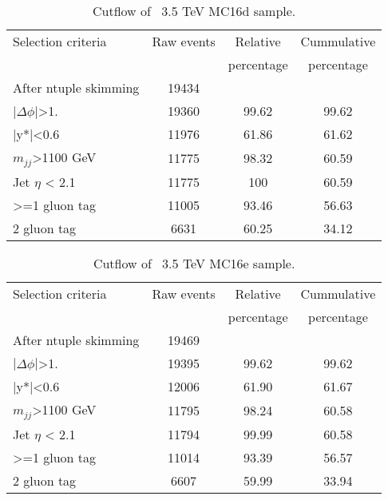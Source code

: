 \begin{table}[ht]
\begin{center}
\begin{tabular}{|l|c|c|c|}
\hline
Selection criteria & Raw events &  Relative & Cummulative \\
 & & percentage & percentage \\
\hline
After ntuple skimming & 19434 &  &  \\
$|\Delta\phi|$>1. & 19360 & 99.62 & 99.62 \\
|y*|<0.6 & 11976 & 61.86 & 61.62 \\
$m_{jj}$>1100 GeV & 11775 & 98.32 & 60.59 \\
Jet $\eta$ < 2.1 & 11775 & 100 & 60.59 \\
>=1 gluon tag & 11005 & 93.46 & 56.63 \\
2 gluon tag & 6631 & 60.25 & 34.12 \\
\hline
\end{tabular}
\end{center}
\caption{Cutflow of \Hprime\ 3.5 TeV MC16d sample.}
\end{table}

\begin{table}[ht]
\begin{center}
\begin{tabular}{|l|c|c|c|}
\hline
Selection criteria & Raw events &  Relative & Cummulative \\
 & & percentage & percentage \\
\hline
After ntuple skimming & 19469 &  &  \\
$|\Delta\phi|$>1. & 19395 & 99.62 & 99.62 \\
|y*|<0.6 & 12006 & 61.90 & 61.67 \\
$m_{jj}$>1100 GeV & 11795 & 98.24 & 60.58 \\
Jet $\eta$ < 2.1 & 11794 & 99.99 & 60.58 \\
>=1 gluon tag & 11014 & 93.39 & 56.57 \\
2 gluon tag & 6607 & 59.99 & 33.94 \\
\hline
\end{tabular}
\end{center}
\caption{Cutflow of \Hprime\ 3.5 TeV MC16e sample.}
\end{table}

